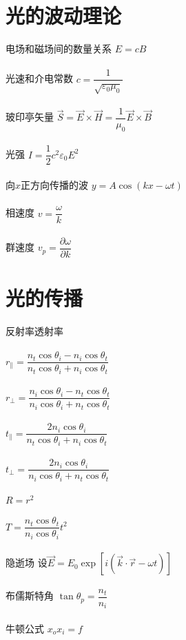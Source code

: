 \documentclass{article}
\begin{document}
\begin{multicols}{2}

\section{光的波动理论}

电场和磁场间的数量关系 $E = c B$
\\\\
光速和介电常数 $c = \dfrac{1}{\sqrt{\varepsilon_0 \mu_0}} $
\\\\
玻印亭矢量 $\vec{S} = \vec{E} \times \vec{H} = \dfrac{1}{\mu_0} \vec{E} \times \vec{B} $
\\\\
光强 $I = \dfrac{1}{2} c^2 \varepsilon_0 E^2 $
\\\\
向$x$正方向传播的波 $y = A \cos \left( k x - \omega t \right)$
\\\\
相速度 $v = \dfrac{\omega}{k} $
\\\\
群速度 $v_p = \dfrac{\partial \omega}{\partial k} $

\section{光的传播}

反射率透射率
\\\\
$r_{\parallel} = \dfrac{n_t \cos \theta_i - n_i \cos \theta_t}{n_t \cos \theta_i + n_i \cos \theta_t} $
\\\\
$r_{\perp} = \dfrac{n_i \cos \theta_i - n_t \cos \theta_t}{n_i \cos \theta_i + n_t \cos \theta_t} $
\\\\
$t_{\parallel} = \dfrac{2 n_i \cos \theta_i}{n_t \cos \theta_i + n_i \cos \theta_t} $
\\\\
$t_{\perp} = \dfrac{2 n_i \cos \theta_i }{n_i \cos \theta_i + n_t \cos \theta_t} $
\\\\
$R = r^2$
\\\\
$T = \dfrac{n_t \cos \theta_t}{n_i \cos \theta_i} t^2 $
\\\\
隐逝场 设$\vec{E} = E_0 \exp \left[ i \left( \vec{k} \cdot \vec{r} - \omega t \right) \right]$
\\\\
布儒斯特角 $\tan \theta_p = \dfrac{n_t}{n_i} $
\\\\
牛顿公式 $x_o x_i = f$


\end{multicols}
\end{document}
